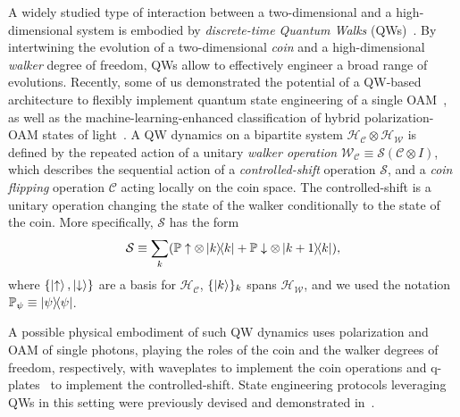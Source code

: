 \documentclass[
	aps, pra,
	superscriptaddress, twocolumn,
	floatfix,
	10pt
]{revtex4-1}
\newcommand{\parTitle}[1]{\noindent{\color{Mahogany}(\emph{#1})}}
\newcommand{\PP}{\mathbb{P}}
\newcommand{\calC}{{\mathcal{C}}}
\newcommand{\calH}{{\mathcal{H}}}
\newcommand{\calS}{{\mathcal{S}}}
\newcommand{\calW}{{\mathcal{W}}}
\newcommand{\HC}{\calH_\calC}
\newcommand{\HW}{\calH_\calW}
\newcommand{\LI}[1]{\highlight{(LI: \textit{#1})}}
\renewcommand{\parTitle}[1]{}
\begin{document}
\parTitle{Background on QWs}
A widely studied type of interaction between a two-dimensional and a high-dimensional system is embodied by \textit{discrete-time Quantum Walks} (QWs)~\cite{aharonov1993quantum,nayak2000quantum,ambainis2001onedimensional,Kempe2003quantum,venegas-andraca2012quantum}.
By intertwining the evolution of a two-dimensional \textit{coin} and a high-dimensional \textit{walker} degree of freedom, QWs allow to effectively engineer a broad range of evolutions.
Recently, some of us demonstrated the potential of a QW-based architecture to flexibly implement quantum state engineering of a single OAM~\cite{innocenti2017quantum,giordani2018experimental}, as well as the machine-learning-enhanced classification of hybrid polarization-OAM states of light~\cite{giordani2020machine}.
A QW dynamics on a bipartite system $\HC\otimes\HW$ is defined by the repeated action of a unitary \textit{walker operation} $\calW_\calC\equiv \calS(\calC\otimes I)$, which describes the sequential action of a \textit{controlled-shift} operation $\calS$, and a \textit{coin flipping} operation $\calC$ acting locally on the coin space.
The controlled-shift is a unitary operation changing the state of the walker conditionally to the state of the coin.
More specifically, $\calS$ has the form
\begin{equation}
    \calS \equiv \sum_k (
        \PP\uparrow\otimes \ketbra{k}{k} +
        \PP\downarrow\otimes \ketbra{k+1}{k}
    ),
\end{equation}
where $\{\ket\uparrow,\ket\downarrow\}$ are a basis for $\HC$, $\{\ket k\}_k$ spans $\HW$, and we used the notation $\PP_\psi\equiv\ketbra\psi$.

A possible physical embodiment of such QW dynamics uses polarization and OAM of single photons, playing the roles of the coin and the walker degrees of freedom, respectively, with waveplates to implement the coin operations and q-plates~\cite{marrucci2006optical} to implement the controlled-shift.
State engineering protocols leveraging QWs in this setting were previously devised and demonstrated in~\cite{innocenti2017quantum,giordani2019experimental,giordani2020machine}.
\end{document}
